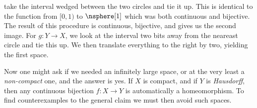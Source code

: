 \documentclass{book}                                                           %
\begin{document}
                take the interval wedged between the two circles and tie it up.
                This is identical to the function from $[0,1)$ to $\nsphere[1]$
                which was both continuous and bijective. The result of this
                procedure is continuous, bijective, and gives us the second
                image. For $g:Y\rightarrow{X}$, we look at the interval two bits
                away from the neareast circle and tie this up. We then translate
                everything to the right by two, yielding the first space.
                \par\hfill\par
                Now one might ask if we needed an infinitely large space, or at
                the very least a \textit{non-compact} one, and the answer is
                yes. If $X$ is compact, and if $Y$ is \textit{Hausdorff}, then
                any continuous bijection $f:X\rightarrow{Y}$ is automatically a
                homeomorphism. To find counterexamples to the general claim we
                must then avoid such spaces.
\end{document}
